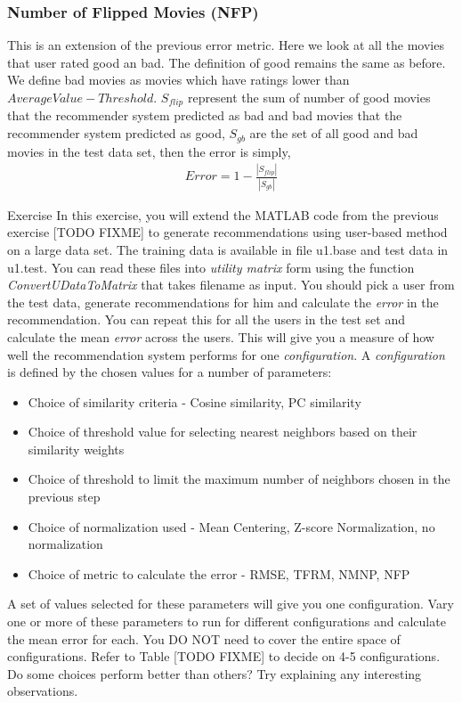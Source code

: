   \subsubsection{Number of Flipped Movies (NFP)}
  This is an extension of the previous error metric. Here we look at all the movies that user rated good an bad. The definition of good remains the same as before. We define bad movies as movies which have ratings lower than $AverageValue - Threshold$. $S_{flip}$ represent the sum of number of good movies that the recommender system predicted as bad and bad movies that the recommender system predicted as good, $S_{gb}$ are the set of all good and bad movies in the test data set, then the error is simply, 
  \begin{align*}
  Error = 1 - \frac{|S_{flip}|}{|S_{gb}|}
  \end{align*}

\begin{myremark}{Exercise }
In this exercise, you will extend the MATLAB code from the previous exercise [TODO FIXME] to generate recommendations using user-based method on a large data set. The training data is available in file u1.base and test data in u1.test. You can read these files into \textit{utility matrix} form using the function \textit{ConvertUDataToMatrix} that takes filename as input. You should pick a user from the test data, generate recommendations for him and calculate the \textit{error} in the recommendation. You can repeat this for all the users in the test set and calculate the mean \textit{error} across the users. This will give you a measure of how well the recommendation system performs for one \textit{configuration}.
A \textit{configuration} is defined by the chosen values for a number of parameters:
\begin{itemize}
\item{}Choice of similarity criteria - Cosine similarity, PC similarity
\item{}Choice of threshold value for selecting nearest neighbors based on their similarity weights
\item{}Choice of threshold to limit the maximum number of neighbors chosen in the previous step
\item{}Choice of normalization used - Mean Centering, Z-score Normalization, no normalization
\item{}Choice of metric to calculate the error - RMSE, TFRM, NMNP, NFP
\end{itemize}
A set of values selected for these parameters will give you one configuration. Vary one or more of these parameters to run for different configurations and calculate the mean error for each. You DO NOT need to cover the entire space of configurations. Refer to Table [TODO FIXME] to decide on 4-5 configurations. Do some choices perform better than others? Try explaining any interesting observations.
\end{myremark}
